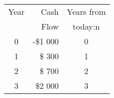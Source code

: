 \begin{tabular}{|c|r|c|}
\hline
Year  & Cash & Years from  \\
 & Flow & today:n \\
\hline
0 & -\$1 000 & 0  \\
1 &  \$  300 & 1  \\
2 &  \$  700 & 2  \\
3 &  \$2 000 & 3  \\
\hline
\end{tabular}